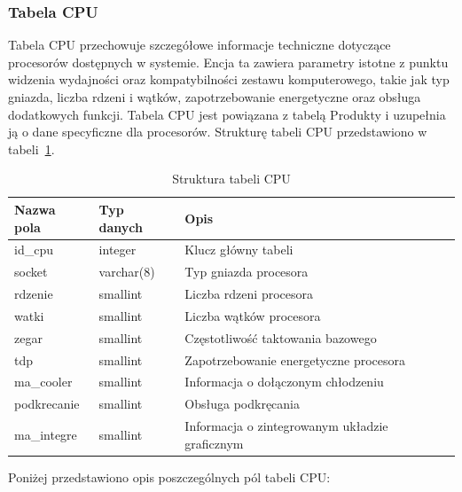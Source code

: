 \documentclass[a4paper,twoside,12pt]{book}
\begin{document}
\subsubsection{Tabela CPU}
Tabela CPU przechowuje szczegółowe informacje techniczne dotyczące procesorów
dostępnych w systemie. Encja ta zawiera parametry istotne z punktu widzenia
wydajności oraz kompatybilności zestawu komputerowego, takie jak typ gniazda,
liczba rdzeni i wątków, zapotrzebowanie energetyczne oraz obsługa dodatkowych
funkcji. Tabela CPU jest powiązana z tabelą Produkty i uzupełnia ją o dane
specyficzne dla procesorów. Strukturę tabeli CPU przedstawiono w
tabeli~\ref{tab:cpu}.

\begin{table}[H]
\centering
\caption{Struktura tabeli CPU}
\label{tab:cpu}
\begin{tabular}{lll}
\hline
Nazwa pola & Typ danych & Opis \\ \hline
id\_cpu & integer & Klucz główny tabeli \\
socket & varchar(8) & Typ gniazda procesora \\
rdzenie & smallint & Liczba rdzeni procesora \\
watki & smallint & Liczba wątków procesora \\
zegar & smallint & Częstotliwość taktowania bazowego \\
tdp & smallint & Zapotrzebowanie energetyczne procesora \\
ma\_cooler & smallint & Informacja o dołączonym chłodzeniu \\
podkrecanie & smallint & Obsługa podkręcania \\
ma\_integre & smallint & Informacja o zintegrowanym układzie graficznym \\ \hline
\end{tabular}
\end{table}

Poniżej przedstawiono opis poszczególnych pól tabeli CPU:
\end{document}
